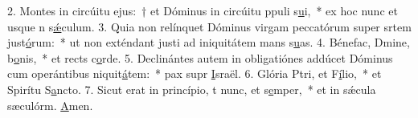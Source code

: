 2. Montes in circúitu ejus:~† et Dóminus in circúitu ppuli s\uline{u}i,~* ex hoc nunc et usque n s\uline{ǽ}culum.
3. Quia non relínquet Dóminus virgam peccatórum super srtem just\uline{ó}rum:~* ut non exténdant justi ad iniquitátem mans s\uline{u}as.
4. Bénefac, Dmine, b\uline{o}nis,~* et rects c\uline{o}rde.
5. Declinántes autem in obligatiónes addúcet Dóminus cum operántibus niquit\uline{á}tem:~* pax supr \uline{I}sraël.
6. Glória Ptri, et F\uline{í}lio,~* et Spirítu S\uline{a}ncto.
7. Sicut erat in princípio, t nunc, et s\uline{e}mper,~* et in sǽcula sæculórm. \uline{A}men.
